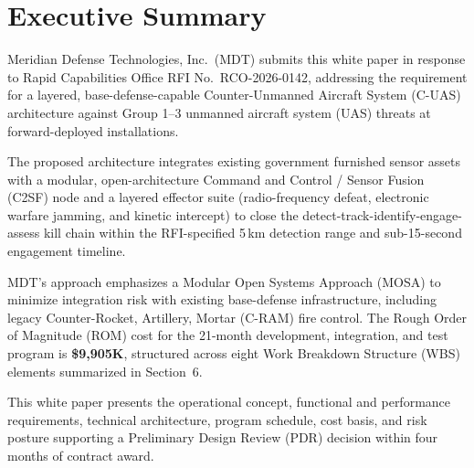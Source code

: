 \section*{Executive Summary}

Meridian Defense Technologies, Inc.\ (MDT) submits this white paper in response to Rapid Capabilities Office RFI No.\ RCO-2026-0142, addressing the requirement for a layered, base-defense-capable Counter-Unmanned Aircraft System (C-UAS) architecture against Group 1--3 unmanned aircraft system (UAS) threats at forward-deployed installations.

The proposed architecture integrates existing government furnished sensor assets with a modular, open-architecture Command and Control / Sensor Fusion (C2SF) node and a layered effector suite (radio-frequency defeat, electronic warfare jamming, and kinetic intercept) to close the detect-track-identify-engage-assess kill chain within the RFI-specified 5\,km detection range and sub-15-second engagement timeline.

MDT's approach emphasizes a Modular Open Systems Approach (MOSA) to minimize integration risk with existing base-defense infrastructure, including legacy Counter-Rocket, Artillery, Mortar (C-RAM) fire control. The Rough Order of Magnitude (ROM) cost for the 21-month development, integration, and test program is \textbf{\$9,905K}, structured across eight Work Breakdown Structure (WBS) elements summarized in Section~6.

This white paper presents the operational concept, functional and performance requirements, technical architecture, program schedule, cost basis, and risk posture supporting a Preliminary Design Review (PDR) decision within four months of contract award.

\clearpage

